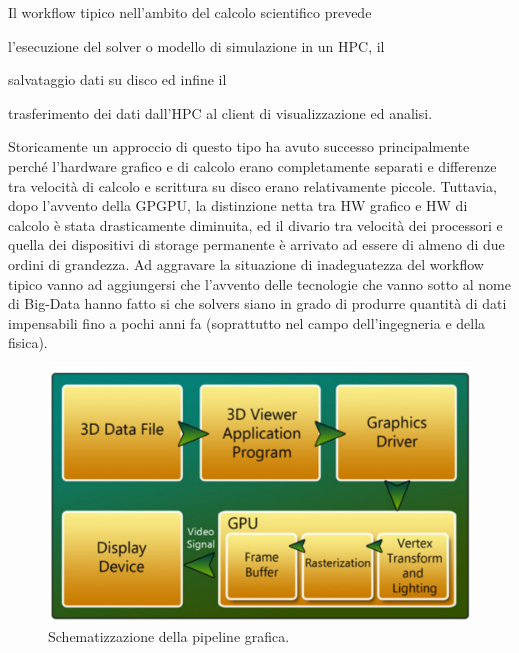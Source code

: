 \documentclass[a4paper,11pt]{paper}
\begin{document}
Il workflow tipico nell'ambito del calcolo scientifico prevede
\begin{inparadesc}
\item[l'esecuzione] del solver o modello di simulazione in un HPC, il
\item[salvataggio]  dati su disco ed infine il
\item[trasferimento] dei dati dall'HPC al client di visualizzazione ed analisi.
\end{inparadesc}
Storicamente un approccio di questo tipo ha avuto successo principalmente perché l'hardware grafico e di calcolo erano completamente separati e differenze tra velocità di calcolo e scrittura su disco erano relativamente piccole.
Tuttavia, dopo l'avvento della GPGPU, la distinzione netta tra HW grafico e
HW di calcolo è stata drasticamente diminuita, ed il divario tra velocità dei processori e quella dei dispositivi di storage permanente è arrivato ad essere di almeno di due ordini di grandezza.
Ad aggravare la situazione di inadeguatezza del workflow tipico vanno ad aggiungersi che l'avvento delle tecnologie che vanno sotto al nome di Big-Data  hanno fatto si che solvers siano in grado di produrre quantità di dati impensabili fino a pochi anni fa (soprattutto nel campo dell'ingegneria e della fisica). 

\begin{figure}
 \centering
   \includegraphics[scale=0.3]{pipeline}
 \caption{Schematizzazione della pipeline grafica.}
       \label{fig:pip}
 \end{figure}
\end{document}
